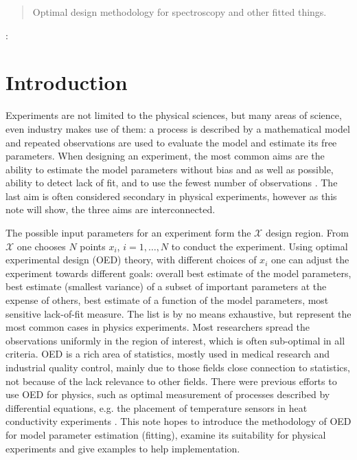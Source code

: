 \documentclass[12pt]{iopart}
\begin{document}
\address{Institute of Atomic and Molecular Sciences, Academia Sinica, Taiwan}
\begin{abstract}
Optimal design methodology for spectroscopy and other fitted things.
\end{abstract}

:

\pacs{}


\section{Introduction}

Experiments are not limited to the physical sciences, but many areas of science, even industry makes use of them: a process is described by a mathematical model and repeated observations are used to evaluate the model and estimate its free parameters. When designing an experiment, the most common aims are the ability to estimate the model parameters without bias and as well as possible, ability to detect lack of fit, and to use the fewest number of observations \cite{Box1975,Box1987}. The last aim is often considered secondary in physical experiments, however as this note will show, the three aims are interconnected.

The possible input parameters for an experiment form the $\mathcal{X}$ design region. From $\mathcal{X}$ one chooses $N$ points $x_i$, $i = 1, \ldots, N$ to conduct the experiment. Using optimal experimental design (OED) theory, with different choices of $x_i$ one can adjust the experiment towards different goals: overall best estimate of the model parameters, best estimate (smallest variance) of a subset of important parameters at the expense of others, best estimate of a function of the model parameters, most sensitive lack-of-fit measure. The list is by no means exhaustive, but represent the most common cases in physics experiments. Most researchers spread the observations uniformly in the region of interest, which is often sub-optimal in all criteria. OED is a rich area of statistics, mostly used in medical research and industrial quality control, mainly due to those fields close connection to statistics, not because of the lack relevance to other fields. There were previous efforts to use OED for physics, such as optimal measurement of processes described by differential equations, e.g. the placement of temperature sensors in heat conductivity experiments \cite{Emery1998}. This note hopes to introduce the methodology of OED for model parameter estimation (fitting), examine its suitability for physical experiments and give examples to help implementation.
\end{document}
